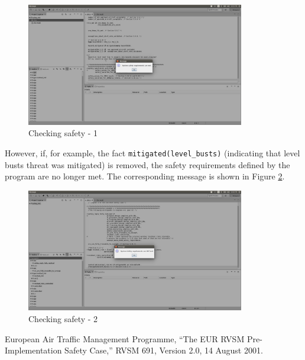 \documentclass[a4paper,10pt]{article}
\begin{document}
\begin{figure}[H]
\centering
\includegraphics[width=0.85\textwidth]{12}
\caption{Checking safety - 1}\label{fig12}
\end{figure}

\noindent
However, if, for example, the fact \texttt{mitigated(level\_busts)} (indicating that level busts threat was mitigated) is removed, the safety requirements defined by the program are no longer met. The corresponding message is shown in Figure \ref{fig13}.

 
\begin{figure}[H]
\centering
\includegraphics[width=0.85\textwidth]{13}
\caption{Checking safety - 2}\label{fig13}
\end{figure}


\begin{thebibliography}{9}
European Air Traffic Management Programme, ``The EUR RVSM Pre-Implementation Safety Case,'' RVSM 691, Version 2.0, 14 August 2001.  
\end{thebibliography}
\end{document}
